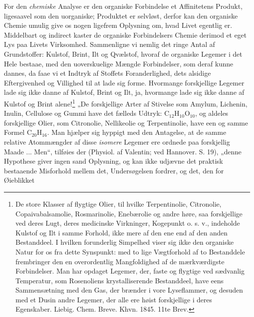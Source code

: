 \documentclass[12pt,a4paper]{book}
\begin{document}
For den \emph{chemiske} Analyse er den organiske Forbindelse et
Affinitetens Produkt, ligesaavel som den uorganiske; Produktet er
selvløst, derfor kan den organiske Chemie umulig give os nogen
ligefrem Oplysning om, hvad Livet egentlig er. Middelbart og
indirect kaster de organiske Forbindelsers Chemie derimod et eget
Lys paa Livets Virksomhed. Sammenligne vi nemlig det ringe Antal af
Grundstoffer: Kulstof, Brint, Ilt og Qvælstof, hvoraf de organiske
Legemer i det Hele bestaae, med den uoverskuelige Mængde
Forbindelser, som deraf kunne dannes, da faae vi et Indtryk af
Stoffets Foranderlighed, dets alsidige Eftergivenhed og Villighed
til at lade sig forme. Hvormange forskjellige Legemer lade sig
\setcounter{footnote}{0}
ikke danne af Kulstof, Brint og Ilt, ja, hvormange lade sig ikke
danne af Kulstof og Brint alene!\footnote{De store Klasser af
flygtige Olier, til hvilke Terpentinolie, Citronolie,
Copaivabalsamolie, Rosmarinolie, Enebærolie og andre høre, saa
forskjellige ved deres Lugt, deres medicinske Virkninger,
Kogepunkt o. s. v., indeholde Kulstof og Ilt i samme Forhold, ikke
mere af den ene end af den anden Bestanddeel. I hvilken forunderlig
Simpelhed viser sig ikke den organiske Natur for os fra dette
Synspunkt: med to lige Vægtforhold af to Bestanddele frembringer
den en overordentlig Mangfoldighed af de mærkværdigste
Forbindelser. Man har opdaget Legemer, der, faste og flygtige ved
sædvanlig Temperatur, som Rosenoliens krystalliserende Bestanddeel,
have eens Sammensætning med den Gas, der brænder i vore
Lyseflammer, og desuden med et Dusin andre Legemer, der alle ere
høist forskjellige i deres Egenskaber. Liebig. Chem. Breve. Khvn.
1845. 11te Brev.}
„De forskjellige Arter af Stivelse som Amylum, Lichenin, Inulin,
Cellulose og Gummi have det fælleds Udtryk:
$\mathrm{C}_{12}\mathrm{H}_{10}\mathrm{O}_{10}$, og aldeles
forskjellige Olier, som Citronolie, Nellikeolie og Terpentinolie,
have een og samme Formel $\mathrm{C}_{20}\mathrm{H}_{16}$. Man
hjælper sig hyppigt med den Antagelse, at de samme relative
Atommængder af disse \emph{isomere} Legemer ere ordnede paa forskjellig
Maade ... Men“, tilføies der (Physiol. af Valentin; ved Hannover.
S. 19), „denne Hypothese giver ingen sand Oplysning, og kan ikke
udjævne det praktisk bestaaende Misforhold mellem det,
Undersøgelsen fordrer, og det, den for Øieblikket
\end{document}

